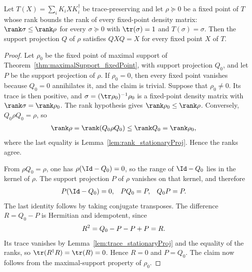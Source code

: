 \begin{theorem}%
    \label{thm:maximalSupport_of_maximalRank}
    \leanok
    Let $T(X)=\sum_iK_iXK_i^\dagger$ be trace-preserving and let
    $\rho\succeq0$ be a fixed point of $T$ whose rank bounds the rank of
    every fixed-point density matrix:
    $\rank\sigma\leq\rank\rho$ for every $\sigma\succeq0$ with
    $\tr(\sigma)=1$ and $T(\sigma)=\sigma$. Then the support projection $Q$
    of $\rho$ satisfies $QXQ=X$ for every fixed point $X$ of $T$.
\end{theorem}

\begin{proof}
    \leanok
    Let $\rho_0$ be the fixed point of maximal support of
    Theorem~\ref{thm:maximalSupport_fixedPoint}, with support projection
    $Q_0$, and let $P$ be the support projection of $\rho$. If $\rho_0=0$,
    then every fixed point vanishes because $Q_0=0$ annihilates it, and the
    claim is trivial. Suppose that $\rho_0\neq0$. Its trace is then
    positive, and $\sigma=(\tr\rho_0)^{-1}\rho_0$ is a fixed-point density
    matrix with $\rank\sigma=\rank\rho_0$. The rank hypothesis gives
    $\rank\rho_0\leq\rank\rho$. Conversely, $Q_0\rho Q_0=\rho$, so
    \begin{align}
        \rank\rho
         & =\rank(Q_0\rho Q_0)
        \leq\rank Q_0
        =\rank\rho_0,
        \notag
    \end{align}
    where the last equality is
    Lemma~\ref{lem:rank_stationaryProj}. Hence the ranks agree.

    From $\rho Q_0=\rho$, one has $\rho(\Id-Q_0)=0$, so the range of
    $\Id-Q_0$ lies in the kernel of $\rho$. The support projection $P$ of
    $\rho$ vanishes on that kernel, and therefore
    \begin{align}
        P(\Id-Q_0) & =0,
                   &
        PQ_0       & =P,
                   &
        Q_0P       & =P.
        \notag
    \end{align}
    The last identity follows by taking conjugate transposes. The difference
    $R=Q_0-P$ is Hermitian and idempotent, since
    \begin{align}
        R^2
         & =Q_0-P-P+P=R.
        \notag
    \end{align}
    Its trace vanishes by Lemma~\ref{lem:trace_stationaryProj} and the
    equality of the ranks, so $\tr(R^\dagger R)=\tr(R)=0$. Hence $R=0$ and
    $P=Q_0$. The claim now follows from the maximal-support property of
    $\rho_0$.
\end{proof}

